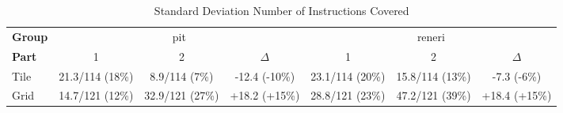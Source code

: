 \begin{sidewaystable}
\centering
\caption{Standard Deviation Number of Instructions Covered}
\label{tab:standard_deviation_number_of_instructions_covered}
\begin{tabular}{lcccccc}
\toprule
\textbf{Group} & \multicolumn{3}{c}{pit} & \multicolumn{3}{c}{reneri} \\
\textbf{Part} & 1 & 2 & $\Delta$ & 1 & 2 & $\Delta$ \\
\cmidrule(lr){1-1} \cmidrule(lr){2-4} \cmidrule(lr){5-7}
Tile & 21.3/114 (18\%) & 8.9/114 (7\%) & -12.4 (-10\%) & 23.1/114 (20\%) & 15.8/114 (13\%) & -7.3 (-6\%) \\
Grid & 14.7/121 (12\%) & 32.9/121 (27\%) & +18.2 (+15\%) & 28.8/121 (23\%) & 47.2/121 (39\%) & +18.4 (+15\%) \\
\bottomrule
\end{tabular}
\end{sidewaystable}
